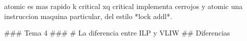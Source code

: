 atomic es mas rapido k critical xq critical implementa cerrojos y atomic una instruccion maquina particular, del estilo *lock addl*.

### Tema 4 ###
# La diferencia entre ILP y VLIW 
## Diferencias
% 
% 






